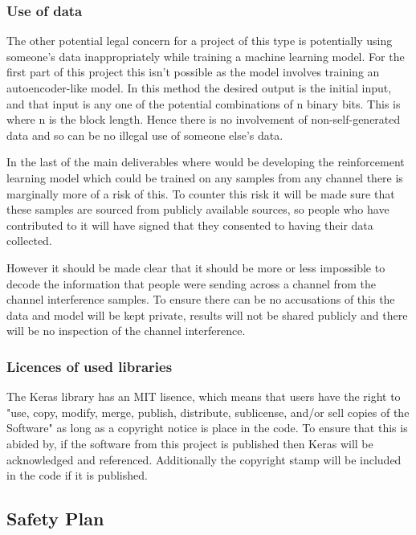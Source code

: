 \documentclass[12pt,onecolumn,letterpaper]{article}
\begin{document}
\subsubsection{Use of data}

The other potential legal concern for a project of this type is potentially using someone's data inappropriately while training a machine learning model. For the first part of this project this isn't possible as the model involves training an autoencoder-like model. In this method the desired output is the initial input, and that input is any one of the potential combinations of n binary bits. This is where n is the block length. Hence there is no involvement of non-self-generated data and so can be no illegal use of someone else's data.

In the last of the main deliverables where would be developing the reinforcement learning model which could be trained on any samples from any channel there is marginally more of a risk of this. To counter this risk it will be made sure that these samples are sourced from publicly available sources, so people who have contributed to it will have signed that they consented to having their data collected. 

However it should be made clear that it should be more or less impossible to decode the information that people were sending across a channel from the channel interference samples. To ensure there can be no accusations of this the data and model will be kept private, results will not be shared publicly and there will be no inspection of the channel interference.

\subsubsection{Licences of used libraries}

The Keras library has an MIT lisence, which means that users have the right to "use, copy, modify, merge, publish, distribute, sublicense, and/or sell copies of the Software" as long as a copyright notice is place in the code. To ensure that this is abided by, if the software from this project is published then Keras will be acknowledged and referenced. Additionally the copyright stamp will be included in the code if it is published. 

\subsection{Safety Plan}
\end{document}
